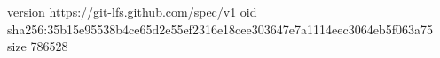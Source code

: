 version https://git-lfs.github.com/spec/v1
oid sha256:35b15e95538b4ce65d2e55ef2316e18cee303647e7a1114eec3064eb5f063a75
size 786528
